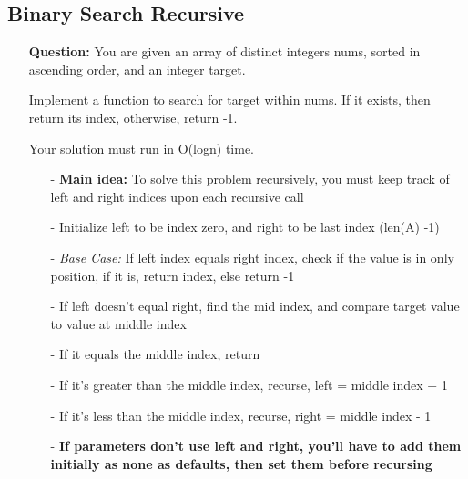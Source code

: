 \documentclass[12pt]{article}
\begin{document}
\subsection{Binary Search Recursive}
\begin{enumerate}
  \item[] \textbf{Question:} You are given an array of distinct integers nums, sorted in ascending order, and an integer target.

Implement a function to search for target within nums. If it exists, then return its index, otherwise, return -1.

Your solution must run in O(logn) time.
    \begin{enumerate}
      \item[-] \textbf{Main idea:} To solve this problem recursively, you must keep track of left and right indices upon each recursive call
      \item[-] Initialize left to be index zero, and right to be last index (len(A) -1)
      \item[-] \textit{Base Case: }If left index equals right index, check if the value is in only position, if it is, return index, else return -1
      \item[-] If left doesn't equal right, find the mid index, and compare target value to value at middle index
      \item[-] If it equals the middle index, return
      \item[-] If it's greater than the middle index, recurse, left = middle index + 1
      \item[-] If it's less than the middle index, recurse, right = middle index - 1
      \item[-] \textbf{If parameters don't use left and right, you'll have to add them initially as none as defaults, then set them before recursing}

    \end{enumerate}
\end{enumerate}
\end{document}
